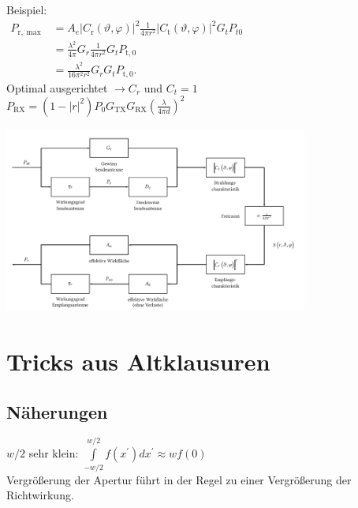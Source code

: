 \documentclass[english]{latex4ei/latex4ei_sheet}
\begin{document}
\begin{sectionbox}
    Beispiel: \\
    $\begin{aligned} P_{\mathrm{r}, \max } & =A_{e}\left|C_{\mathrm{r}}(\vartheta, \varphi)\right|^{2} \frac{1}{4 \pi r^{2}}\left|C_{\mathrm{t}}(\vartheta, \varphi)\right|^{2} G_{t} P_{t 0} \\
                                  & =\frac{\lambda^{2}}{4 \pi} G_{r} \frac{1}{4 \pi r^{2}} G_{t} P_{\mathrm{t}, 0}                                                                   \\
                                  & =\frac{\lambda^{2}}{16 \pi^{2} r^{2}} G_{r} G_{t} P_{\mathrm{t}, 0} .\end{aligned}$\\
    Optimal ausgerichtet $\rightarrow C_r$ und $C_t=1$\\
    $P_{\mathrm{RX}}=\left(1-|r|^{2}\right) P_{0} G_{\mathrm{TX}} G_{\mathrm{RX}}\left(\frac{\lambda}{4 \pi d}\right)^{2}$
\end{sectionbox}

\begin{sectionbox}
    \includegraphics[width=10cm, angle=90]{./img/antennen_blockdiagram.png}
\end{sectionbox}
\section{Tricks aus Altklausuren}
\begin{sectionbox}
    \subsection{Näherungen}
    $w/2$ sehr klein: $\int\limits_{-w/2}^{w/2}f(x^{\prime}) d x^{\prime} \approx w f(0)$\\
    Vergrößerung der Apertur führt in der Regel zu einer Vergrößerung der Richtwirkung.\\
\end{sectionbox}
\end{document}
